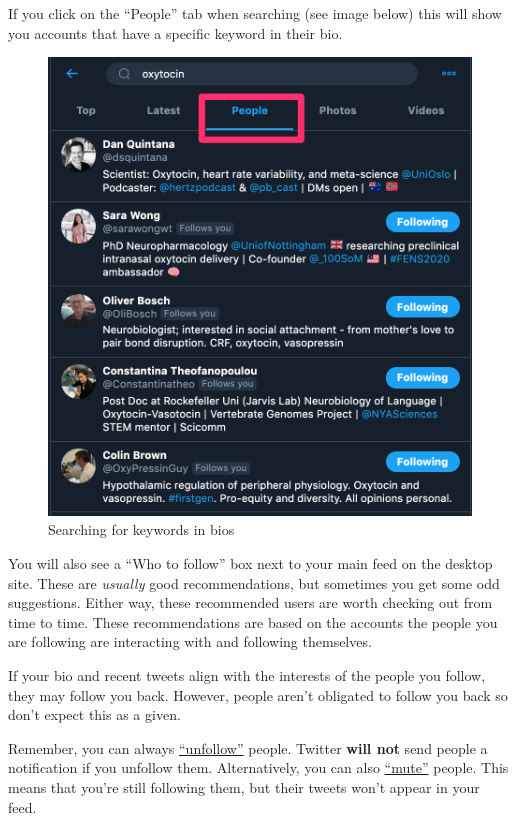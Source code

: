 \documentclass[
]{book}
\begin{document}
If you click on the ``People'' tab when searching (see image below) this will show you accounts that have a specific keyword in their bio.

\begin{figure}

\includegraphics[width=0.8\linewidth]{images/bio_search} \hfill{}

\caption{Searching for keywords in bios}\label{fig:unnamed-chunk-9}
\end{figure}

You will also see a ``Who to follow'' box next to your main feed on the desktop site. These are \emph{usually} good recommendations, but sometimes you get some odd suggestions. Either way, these recommended users are worth checking out from time to time. These recommendations are based on the accounts the people you are following are interacting with and following themselves.

If your bio and recent tweets align with the interests of the people you follow, they may follow you back. However, people aren't obligated to follow you back so don't expect this as a given.

Remember, you can always \href{https://help.twitter.com/en/using-twitter/how-to-unfollow-on-twitter}{``unfollow''} people. Twitter \textbf{will not} send people a notification if you unfollow them. Alternatively, you can also \href{https://help.twitter.com/en/using-twitter/twitter-mute}{``mute''} people. This means that you're still following them, but their tweets won't appear in your feed.
\end{document}
